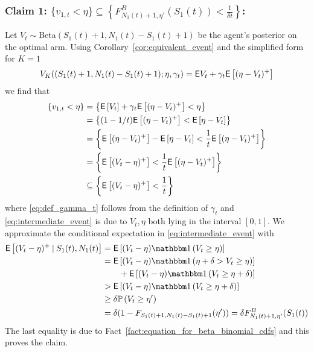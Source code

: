 \begin{myproof}[Proof.]
	\subsubsection*{Claim 1: $\{v_{1,t} < \eta\} \subseteq \left\{F^B_{N_1(t)+1, \eta'}(S_1(t)) < \frac{1}{\delta t}\right\}$:}
	Let $V_t \sim $Beta$(S_1(t)+1,N_1(t) - S_1(t) + 1)$ be the agent's posterior on the optimal arm. Using Corollary~\ref{cor:equivalent_event} and the simplified form for $K=1$ \[V_K((S_1(t)+1, N_1(t) - S_1(t) + 1); \eta, \gamma_t) = \mathsf{E}{V_t} + \gamma_t\mathsf{E} \left[ (\eta - V_t)^+ \right]\] we find that
	\begin{align}
	\left\{v_{1,t} < \eta \right\} & = \left\{ \mathsf{E} \left[ V_t  \right] + \gamma_t\mathsf{E} \left[ (\eta - V_t)^+ \right] < \eta \right\} \nonumber\\
	& =  \left\{ (1-1/t)\mathsf{E} \left[ (\eta - V_t)^+ \right] < \mathsf{E} \left[ \eta - V_t \right] \right\} \label{eq:def_gamma_t} \\
	& =  \left\{ \mathsf{E} \left[ (\eta - V_t)^+ \right] - \mathsf{E} \left[ \eta - V_t \right] <  \frac{1}{t}\mathsf{E} \left[ (\eta - V_t)^+ \right]\right\} \nonumber\\
	& =  \left\{ \mathsf{E} \left[ (V_t - \eta)^+ \right]<  \frac{1}{t}\mathsf{E} \left[ (\eta - V_t)^+ \right]\right\} \nonumber\\
	& \subseteq \left\{ \mathsf{E} \left[  (V_t - \eta)^+ \right]< \frac{1}{t}  \right\}  \label{eq:intermediate_event}
	\end{align}
	where \eqref{eq:def_gamma_t} follows from the definition of $\gamma_t$ and \eqref{eq:intermediate_event} is due to $V_t, \eta$ both lying in the interval $[0,1]$. We approximate the conditional expectation in \eqref{eq:intermediate_event} with
	\begin{align}
	\Ee{(V_t - \eta)^+ \given S_1(t), N_1(t)} & = \Ee{(V_t - \eta) \ind{V_t \ge \eta} }\nonumber \\
	& = \Ee{(V_t - \eta) \ind{\eta + \delta > V_t \ge \eta} }  \nonumber \\
	& \qquad + \Ee{(V_t - \eta) \ind{ V_t \ge \eta + \delta} } \nonumber \\
	& > \Ee{(V_t - \eta) \ind{ V_t \ge \eta + \delta} } \nonumber \\
	& \ge \delta\P{ V_t \ge \eta' } \nonumber \\
	& = \delta (1 - F_{S_1(t)+1,N_1(t)-S_1(t)+1}(\eta')) = \delta F^B_{N_1(t)+1,\eta'}(S_1(t)) \label{ineq:lower_bound_on_ppart_term}
	\end{align}
	The last equality is due to Fact~\ref{fact:equation_for_beta_binomial_cdfs} and this proves the claim.

\end{myproof}
